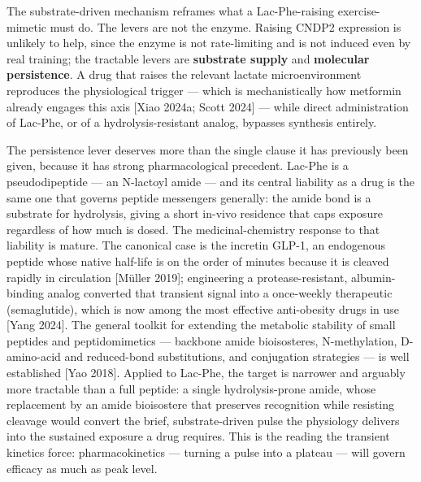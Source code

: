 \documentclass[11pt]{article}
\begin{document}
The substrate-driven mechanism reframes what a Lac-Phe-raising exercise-mimetic must do. The
levers are not the enzyme. Raising CNDP2 expression is unlikely to help, since the enzyme is
not rate-limiting and is not induced even by real training; the tractable levers are
\textbf{substrate supply} and \textbf{molecular persistence}. A drug that raises the relevant lactate
microenvironment reproduces the physiological trigger --- which is mechanistically how
metformin already engages this axis [Xiao 2024a; Scott 2024] --- while direct administration of
Lac-Phe, or of a hydrolysis-resistant analog, bypasses synthesis entirely.

The persistence lever deserves more than the single clause it has previously been given,
because it has strong pharmacological precedent. Lac-Phe is a pseudodipeptide --- an
N-lactoyl amide --- and its central liability as a drug is the same one that governs peptide
messengers generally: the amide bond is a substrate for hydrolysis, giving a short
in-vivo residence that caps exposure regardless of how much is dosed. The medicinal-chemistry
response to that liability is mature. The canonical case is the incretin GLP-1, an endogenous
peptide whose native half-life is on the order of minutes because it is cleaved rapidly in
circulation [M\"uller 2019]; engineering a protease-resistant, albumin-binding analog converted
that transient signal into a once-weekly therapeutic (semaglutide), which is now among the
most effective anti-obesity drugs in use [Yang 2024]. The general toolkit for extending the
metabolic stability of small peptides and peptidomimetics --- backbone amide bioisosteres,
N-methylation, D-amino-acid and reduced-bond substitutions, and conjugation strategies --- is
well established [Yao 2018]. Applied to Lac-Phe, the target is narrower and arguably more
tractable than a full peptide: a single hydrolysis-prone amide, whose replacement by an
amide bioisostere that preserves recognition while resisting cleavage would convert the brief,
substrate-driven pulse the physiology delivers into the sustained exposure a drug requires.
This is the reading the transient kinetics force: pharmacokinetics --- turning a pulse into a
plateau --- will govern efficacy as much as peak level.
\end{document}

